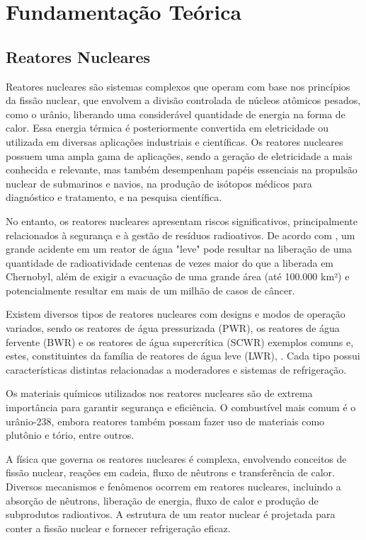 \chapter{Fundamentação Teórica} \label{chap:theory}

\section{Reatores Nucleares}

Reatores nucleares são sistemas complexos que operam com base nos princípios da fissão nuclear, que envolvem a divisão controlada de núcleos atômicos pesados, como o urânio, liberando uma considerável quantidade de energia na forma de calor. Essa energia térmica é posteriormente convertida em eletricidade ou utilizada em diversas aplicações industriais e científicas. Os reatores nucleares possuem uma ampla gama de aplicações, sendo a geração de eletricidade a mais conhecida e relevante, mas também desempenham papéis essenciais na propulsão nuclear de submarinos e navios, na produção de isótopos médicos para diagnóstico e tratamento, e na pesquisa científica.

No entanto, os reatores nucleares apresentam riscos significativos, principalmente relacionados à segurança e à gestão de resíduos radioativos. De acordo com \citet{hirsch2005}, um grande acidente em um reator de água "leve" pode resultar na liberação de uma quantidade de radioatividade centenas de vezes maior do que a liberada em Chernobyl, além de exigir a evacuação de uma grande área (até 100.000 km²) e potencialmente resultar em mais de um milhão de casos de câncer.

Existem diversos tipos de reatores nucleares com designs e modos de operação variados, sendo os reatores de água pressurizada (PWR), os reatores de água fervente (BWR) e os reatores de água supercrítica (SCWR) exemplos comuns e, estes, constituintes da família de reatores de água leve (LWR), \citep{salome2016}. Cada tipo possui características distintas relacionadas a moderadores e sistemas de refrigeração.

Os materiais químicos utilizados nos reatores nucleares são de extrema importância para garantir segurança e eficiência. O combustível mais comum é o urânio-238, embora reatores também possam fazer uso de materiais como plutônio e tório, entre outros.

A física que governa os reatores nucleares é complexa, envolvendo conceitos de fissão nuclear, reações em cadeia, fluxo de nêutrons e transferência de calor. Diversos mecanismos e fenômenos ocorrem em reatores nucleares, incluindo a absorção de nêutrons, liberação de energia, fluxo de calor e produção de subprodutos radioativos. A estrutura de um reator nuclear é projetada para conter a fissão nuclear e fornecer refrigeração eficaz.

